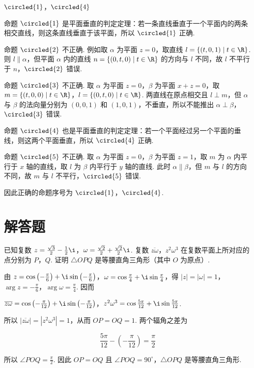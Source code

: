 \documentclass[UTF8,a4paper,oneside,11pt]{ctexbook}
\begin{document}
\begin{answer}
\(\circled{1}\)，\(\circled{4}\)
\end{answer}

\begin{solution}
命题 \(\circled{1}\) 是平面垂直的判定定理：若一条直线垂直于一个平面内的两条相交直线，则这条直线垂直于该平面，所以 \(\circled{1}\) 正确.

命题 \(\circled{2}\) 不正确. 例如取 \(\alpha\) 为平面 \(z=0\)，取直线 \(l=\{(t,0,1)\mid t\in\R\}\). 则 \(l\parallel\alpha\)，但平面 \(\alpha\) 内的直线 \(n=\{(0,t,0)\mid t\in\R\}\) 的方向与 \(l\) 不同，故 \(l\) 不平行于 \(n\)，\(\circled{2}\) 错误.

命题 \(\circled{3}\) 不正确. 取 \(\alpha\) 为平面 \(z=0\)，\(\beta\) 为平面 \(x+z=0\)，取 \(m=\{(t,0,0)\mid t\in\R\}\)，\(l=\{(0,t,0)\mid t\in\R\}\). 两直线在原点相交且 \(l\perp m\)，但 \(\alpha\) 与 \(\beta\) 的法向量分别为 \((0,0,1)\) 和 \((1,0,1)\)，不垂直，所以不能推出 \(\alpha\perp\beta\)，\(\circled{3}\) 错误.

命题 \(\circled{4}\) 也是平面垂直的判定定理：若一个平面经过另一个平面的垂线，则这两个平面垂直，所以 \(\circled{4}\) 正确.

命题 \(\circled{5}\) 不正确. 取 \(\alpha\) 为平面 \(z=0\)，\(\beta\) 为平面 \(z=1\)，取 \(m\) 为 \(\alpha\) 内平行于 \(x\) 轴的直线，取 \(l\) 为 \(\beta\) 内平行于 \(y\) 轴的直线. 此时 \(\alpha\parallel\beta\)，但 \(m\) 与 \(l\) 的方向不同，故 \(m\) 与 \(l\) 不平行，\(\circled{5}\) 错误.

因此正确的命题序号为 \(\circled{1}\)，\(\circled{4}\).
\end{solution}

\section{解答题}

\begin{problem}
已知复数 \(z = \frac{\sqrt{3}}{2} - \frac{1}{2}\i\)，\(\omega = \frac{\sqrt{2}}{2} + \frac{\sqrt{2}}{2}\i\). 复数 \(\overline{z\omega}\)，\(z^{2}\omega^{3}\) 在复数平面上所对应的点分别为 \(P\)，\(Q\). 证明 \(\triangle OPQ\) 是等腰直角三角形（其中 \(O\) 为原点）.
\end{problem}

\begin{solution}
由 \(z=\cos\left(-\frac{\pi}{6}\right)+\i\sin\left(-\frac{\pi}{6}\right)\)，\(\omega=\cos\frac{\pi}{4}+\i\sin\frac{\pi}{4}\)，得 \(|z|=|\omega|=1\)，\(\arg z=-\frac{\pi}{6}\)，\(\arg\omega=\frac{\pi}{4}\). 因而

\(\overline{z\omega}=\cos\left(-\frac{\pi}{12}\right)+\i\sin\left(-\frac{\pi}{12}\right)\)，\(z^{2}\omega^{3}=\cos\frac{5\pi}{12}+\i\sin\frac{5\pi}{12}\).

所以 \(|\overline{z\omega}|=|z^{2}\omega^{3}|=1\)，从而 \(OP=OQ=1\). 两个辐角之差为

\[
\frac{5\pi}{12}-\left(-\frac{\pi}{12}\right)=\frac{\pi}{2}
\]

所以 \(\angle POQ=\frac{\pi}{2}\). 因此 \(OP=OQ\) 且 \(\angle POQ=90^\circ\)，\(\triangle OPQ\) 是等腰直角三角形.
\end{solution}
\end{document}
